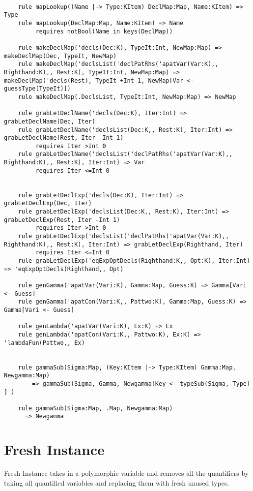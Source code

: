 \begin{lstlisting}

    rule mapLookup((Name |-> Type:KItem) DeclMap:Map, Name:KItem) => Type
    rule mapLookup(DeclMap:Map, Name:KItem) => Name
         requires notBool(Name in keys(DeclMap))

    rule makeDeclMap('decls(Dec:K), TypeIt:Int, NewMap:Map) => makeDeclMap(Dec, TypeIt, NewMap)
    rule makeDeclMap('declsList('declPatRhs('apatVar(Var:K),, Righthand:K),, Rest:K), TypeIt:Int, NewMap:Map) => makeDeclMap('decls(Rest), TypeIt +Int 1, NewMap[Var <- guessType(TypeIt)])
    rule makeDeclMap(.DeclsList, TypeIt:Int, NewMap:Map) => NewMap

    rule grabLetDeclName('decls(Dec:K), Iter:Int) => grabLetDeclName(Dec, Iter)
    rule grabLetDeclName('declsList(Dec:K,, Rest:K), Iter:Int) => grabLetDeclName(Rest, Iter -Int 1)
         requires Iter >Int 0
    rule grabLetDeclName('declsList('declPatRhs('apatVar(Var:K),, Righthand:K),, Rest:K), Iter:Int) => Var
         requires Iter <=Int 0


    rule grabLetDeclExp('decls(Dec:K), Iter:Int) => grabLetDeclExp(Dec, Iter)
    rule grabLetDeclExp('declsList(Dec:K,, Rest:K), Iter:Int) => grabLetDeclExp(Rest, Iter -Int 1)
         requires Iter >Int 0
    rule grabLetDeclExp('declsList('declPatRhs('apatVar(Var:K),, Righthand:K),, Rest:K), Iter:Int) => grabLetDeclExp(Righthand, Iter)
         requires Iter <=Int 0
    rule grabLetDeclExp('eqExpOptDecls(Righthand:K,, Opt:K), Iter:Int) => 'eqExpOptDecls(Righthand,, Opt)

    rule genGamma('apatVar(Vari:K), Gamma:Map, Guess:K) => Gamma[Vari <- Guess]
    rule genGamma('apatCon(Vari:K,, Pattwo:K), Gamma:Map, Guess:K) => Gamma[Vari <- Guess]

    rule genLambda('apatVar(Vari:K), Ex:K) => Ex
    rule genLambda('apatCon(Vari:K,, Pattwo:K), Ex:K) => 'lambdaFun(Pattwo,, Ex)


    rule gammaSub(Sigma:Map, (Key:KItem |-> Type:KItem) Gamma:Map, Newgamma:Map)
        => gammaSub(Sigma, Gamma, Newgamma[Key <- typeSub(Sigma, Type) ] )

    rule gammaSub(Sigma:Map, .Map, Newgamma:Map)
      => Newgamma
\end{lstlisting}
\section{Fresh Instance}

Fresh Instance takes in a polymorphic variable and removes all the quantifiers by taking all quantified variables and replacing them with fresh unused types.


